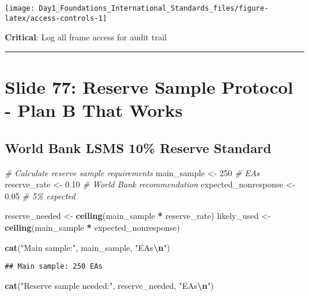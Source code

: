 \documentclass[
]{article}
\newenvironment{Shaded}{\begin{snugshade}}{\end{snugshade}}
\newcommand{\CommentTok}[1]{\textcolor[rgb]{0.56,0.35,0.01}{\textit{#1}}}
\newcommand{\DecValTok}[1]{\textcolor[rgb]{0.00,0.00,0.81}{#1}}
\newcommand{\FloatTok}[1]{\textcolor[rgb]{0.00,0.00,0.81}{#1}}
\newcommand{\FunctionTok}[1]{\textcolor[rgb]{0.13,0.29,0.53}{\textbf{#1}}}
\newcommand{\NormalTok}[1]{#1}
\newcommand{\OtherTok}[1]{\textcolor[rgb]{0.56,0.35,0.01}{#1}}
\newcommand{\SpecialCharTok}[1]{\textcolor[rgb]{0.81,0.36,0.00}{\textbf{#1}}}
\newcommand{\StringTok}[1]{\textcolor[rgb]{0.31,0.60,0.02}{#1}}
\begin{document}
\texttt{[image: Day1\_Foundations\_International\_Standards\_files/figure-latex/access-controls-1]}

\textbf{Critical}: Log all frame access for audit trail

\begin{center}\rule{0.5\linewidth}{0.5pt}\end{center}

\section{Slide 77: Reserve Sample Protocol - Plan B That
Works}\label{slide-77-reserve-sample-protocol---plan-b-that-works}

\subsection{World Bank LSMS 10\% Reserve
Standard}\label{world-bank-lsms-10-reserve-standard}

\begin{Shaded}
\begin{Highlighting}[]
\CommentTok{\# Calculate reserve sample requirements}
\NormalTok{main\_sample }\OtherTok{\textless{}{-}} \DecValTok{250}  \CommentTok{\# EAs}
\NormalTok{reserve\_rate }\OtherTok{\textless{}{-}} \FloatTok{0.10}  \CommentTok{\# World Bank recommendation}
\NormalTok{expected\_nonresponse }\OtherTok{\textless{}{-}} \FloatTok{0.05}  \CommentTok{\# 5\% expected}

\NormalTok{reserve\_needed }\OtherTok{\textless{}{-}} \FunctionTok{ceiling}\NormalTok{(main\_sample }\SpecialCharTok{*}\NormalTok{ reserve\_rate)}
\NormalTok{likely\_used }\OtherTok{\textless{}{-}} \FunctionTok{ceiling}\NormalTok{(main\_sample }\SpecialCharTok{*}\NormalTok{ expected\_nonresponse)}

\FunctionTok{cat}\NormalTok{(}\StringTok{"Main sample:"}\NormalTok{, main\_sample, }\StringTok{"EAs}\SpecialCharTok{\textbackslash{}n}\StringTok{"}\NormalTok{)}
\end{Highlighting}
\end{Shaded}

\begin{verbatim}
## Main sample: 250 EAs
\end{verbatim}

\begin{Shaded}
\begin{Highlighting}[]
\FunctionTok{cat}\NormalTok{(}\StringTok{"Reserve sample needed:"}\NormalTok{, reserve\_needed, }\StringTok{"EAs}\SpecialCharTok{\textbackslash{}n}\StringTok{"}\NormalTok{)}
\end{Highlighting}
\end{Shaded}
\end{document}
